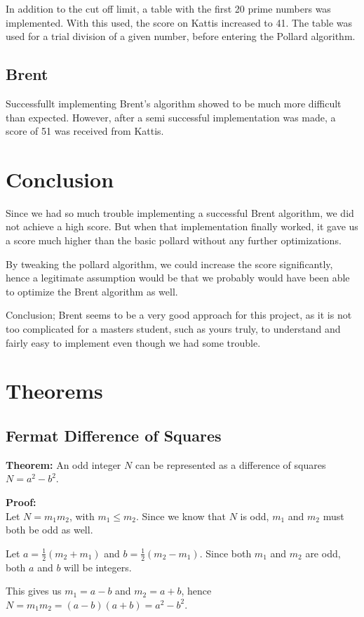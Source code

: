 \documentclass[a4paper, 12pt]{report}
\begin{document}
In addition to the cut off limit, a table with the first 20 prime numbers was implemented. With this used, the score on Kattis increased to 41. The table was used for a trial division of a given number, before entering the Pollard algorithm.

\section{Brent}
Successfullt implementing Brent's algorithm showed to be much more difficult than expected. However, after a semi successful implementation was made, a score of 51 was received from Kattis.

\chapter{Conclusion}
Since we had so much trouble implementing a successful Brent algorithm, we did not achieve a high score. But when that implementation finally worked, it gave us a score much higher than the basic pollard without any further optimizations.

By tweaking the pollard algorithm, we could increase the score significantly, hence a legitimate assumption would be that we probably would have been able to optimize the Brent algorithm as well. 

Conclusion; Brent seems to be a very good approach for this project, as it is not too complicated for a masters student, such as yours truly, to understand and fairly easy to implement even though we had some trouble.
\appendix
\chapter{Theorems}
\section{Fermat Difference of Squares}
\label{sec:fermatproof}
\begin{description}
\item{\bf Theorem:} An odd integer $N$ can be represented as a difference of squares $N = a^2 - b^2$.


\item{\bf Proof:} \\
Let $ N = m_1m_2 $, with $ m_1 \le m_2 $. Since we know that $N$ is odd, $m_1$ and $m_2$ must both be odd as well.

Let $ a = \frac{1}{2} (m_2 + m_1) $ and $ b = \frac{1}{2} (m_2 - m_1) $. Since both $m_1$ and $m_2$ are odd, both $a$ and $b$ will be integers. 

This gives us $m_1 = a - b$ and $m_2 = a + b $, hence $N = m_1m_2 = (a - b)(a + b) = a^2 - b^2$.

\end{description}
\end{document}
